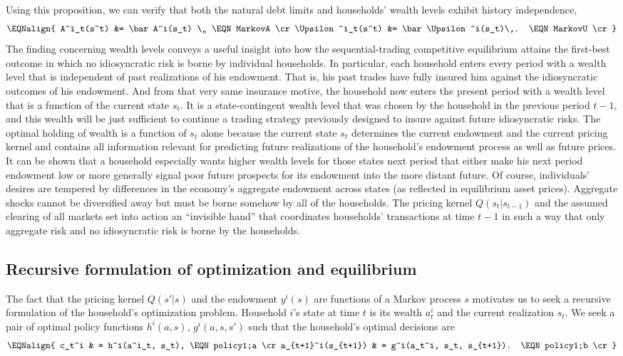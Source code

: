 Using this proposition, we can verify that both the natural debt
limits  and households' wealth levels 
exhibit history independence,
$$\EQNalign{
 A^i_t(s^t) &= \bar A^i(s_t) \,,              \EQN MarkovA \cr
 \Upsilon^i_t(s^t) &= \bar \Upsilon^i(s_t)\,. \EQN MarkovU \cr}
$$
The finding concerning wealth levels  conveys a  useful
insight into how the sequential-trading competitive equilibrium
attains the first-best outcome in which no idiosyncratic risk is
borne by individual households. In particular, each household
enters every period with a wealth level that is independent of
past realizations of his endowment. That is, his past trades have
fully insured him against the idiosyncratic outcomes of his
endowment. And from that very same insurance motive, the household
now enters the present period with a wealth level that is a
function of the current state $s_t$. It is a state-contingent
wealth level that was chosen by the household in the previous
period $t-1$, and this wealth will be just sufficient to
continue  a trading strategy previously designed to insure against future
idiosyncratic risks. The optimal holding of wealth is  a function
 of $s_t$ alone because the current state $s_t$ determines the
current endowment and the current pricing kernel  and contains all information
relevant for predicting
future realizations of the household's endowment process as well as future prices. It can
be shown that a household especially wants  higher wealth levels for
those states next period that  either  make his next period
endowment low or more generally  signal poor future prospects for its endowment into
the more distant future. Of course, individuals' desires are tempered by differences in the economy's
aggregate endowment across states (as reflected in equilibrium
asset prices). Aggregate shocks cannot be diversified away but
must  be borne somehow  by all of the households. The pricing kernel
$Q(s_t\vert s_{t-1})$ and the assumed clearing of all markets
set into action  an ``invisible hand'' that coordinates households'
transactions at time $t-1$  in such a way  that only aggregate
risk and  no idiosyncratic risk is borne by the households.




\subsection{Recursive formulation of optimization and equilibrium}
The fact  that the pricing kernel $Q(s'|s)$ and the endowment $y^i(s)$
are functions of a Markov process $s$ motivates us to seek a
recursive formulation of the household's optimization problem.
Household $i$'s state at time $t$ is its wealth $a^i_t$ and the
current realization $s_t$. We seek a pair of optimal policy
functions $h^i(a,s)$, $g^i(a,s,s')$ such that the household's
optimal decisions are
$$\EQNalign{ c_t^i  & = h^i(a^i_t, s_t),   \EQN policy1;a \cr
         a_{t+1}^i(s_{t+1}) & = g^i(a_t^i, s_t, s_{t+1}). \EQN policy1;b
  \cr} $$


